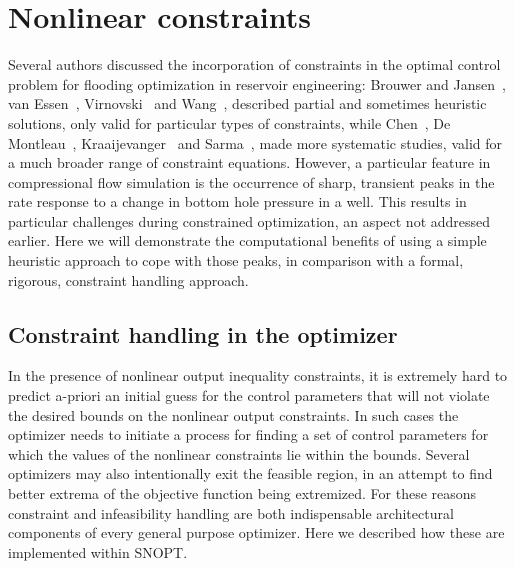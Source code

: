 \documentclass[twocolumn,numbook]{svjour3}          %
\def\SNOPT {{\small SNOPT}}
\begin{document}
\section{Nonlinear constraints} \label{sec:constraints} 
Several authors discussed the incorporation of constraints in the optimal
control problem for flooding optimization in reservoir engineering: Brouwer and 
Jansen~\cite{Brouwer:2004}, van Essen~\cite{VanEssen}, Virnovski~\cite{Virnovski} and
Wang~\cite{Wang:2009},
described partial and sometimes heuristic solutions, only valid for
particular types of constraints, while Chen~\cite{Chen:2010}, De Montleau~\cite{Montleau},
 Kraaijevanger~\cite{Kraaijevanger} and Sarma~\cite{Pallav:2006, Pallav:2008}, 
made more systematic studies, valid for a
much broader range of constraint equations. However, a particular feature in
compressional flow simulation is the occurrence of sharp, transient peaks in the
rate  response to a change in bottom hole pressure in a well. This results in
particular challenges during constrained optimization, an aspect not addressed
earlier. Here we will demonstrate the computational benefits of using a simple
heuristic approach to cope with those peaks, in comparison with a formal,
rigorous, constraint handling approach.




\subsection{Constraint handling in the optimizer} \label{sec:constr-opt}
In the presence of nonlinear output inequality constraints, 
it is extremely hard to predict a-priori an initial guess for the control parameters that will 
not violate the desired bounds on the nonlinear output constraints.   In such cases
the optimizer needs to initiate a process for finding a set of control parameters for which
the values of the nonlinear constraints lie within the bounds. Several optimizers
may also intentionally exit the feasible region, in an attempt to find better extrema of the
objective function being extremized. For these reasons constraint and infeasibility 
handling are both indispensable architectural components 
of every general purpose optimizer.  Here we described how these are implemented within \SNOPT{}. 
\end{document}
